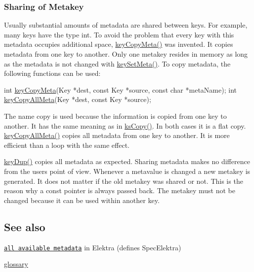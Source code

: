 \subsubsection*{Sharing of Metakey}

Usually substantial amounts of metadata are shared between keys. For example, many keys have the type {\ttfamily int}. To avoid the problem that every key with this metadata occupies additional space, {\ttfamily \hyperlink{group__keymeta_ga9a22b992478e613c8788bd460b4a1f0c}{key\+Copy\+Meta()}} was invented. It copies metadata from one key to another. Only one metakey resides in memory as long as the metadata is not changed with {\ttfamily \hyperlink{group__keymeta_gae1f15546b234ffb6007d8a31178652b9}{key\+Set\+Meta()}}. To copy metadata, the following functions can be used\+:


\begin{DoxyCode}
\textcolor{keywordtype}{int} \hyperlink{group__keymeta_ga9a22b992478e613c8788bd460b4a1f0c}{keyCopyMeta}(Key *dest, \textcolor{keyword}{const} Key *source, \textcolor{keyword}{const} \textcolor{keywordtype}{char} *metaName);
\textcolor{keywordtype}{int} \hyperlink{group__keymeta_ga8e63720a65610a29597494d0671f9401}{keyCopyAllMeta}(Key *dest, \textcolor{keyword}{const} Key *source);
\end{DoxyCode}


The name {\ttfamily copy} is used because the information is copied from one key to another. It has the same meaning as in {\ttfamily \hyperlink{group__keyset_gaba1f1dbea191f4d7e7eb3e4296ae7d5e}{ks\+Copy()}}. In both cases it is a flat copy. {\ttfamily \hyperlink{group__keymeta_ga8e63720a65610a29597494d0671f9401}{key\+Copy\+All\+Meta()}} copies all metadata from one key to another. It is more efficient than a loop with the same effect.

{\ttfamily \hyperlink{group__key_gae6ec6a60cc4b8c1463fa08623d056ce3}{key\+Dup()}} copies all metadata as expected. Sharing metadata makes no difference from the user\textquotesingle{}s point of view. Whenever a metavalue is changed a new metakey is generated. It does not matter if the old metakey was shared or not. This is the reason why a const pointer is always passed back. The metakey must not be changed because it can be used within another key.

\subsection*{See also}


\begin{DoxyItemize}
\item \href{/home/markus/Projekte/Elektra/current/doc/METADATA.ini}{\tt all available metadata} in Elektra (defines Spec\+Elektra)
\item \hyperlink{doc_help_elektra-glossary_md}{glossary} 
\end{DoxyItemize}